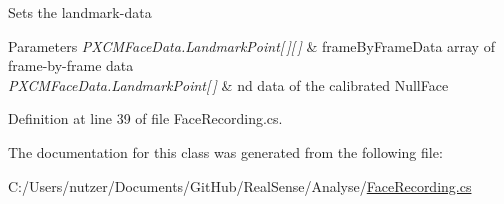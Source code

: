 Sets the landmark-\/data 
\begin{DoxyParams}{Parameters}
{\em P\+X\+C\+M\+Face\+Data.\+Landmark\+Point\mbox{[}$\,$\mbox{]}\mbox{[}$\,$\mbox{]}} & frame\+By\+Frame\+Data array of frame-\/by-\/frame data \\
\hline
{\em P\+X\+C\+M\+Face\+Data.\+Landmark\+Point\mbox{[}$\,$\mbox{]}} & nd data of the calibrated Null\+Face \\
\hline
\end{DoxyParams}


Definition at line 39 of file Face\+Recording.\+cs.



The documentation for this class was generated from the following file\+:\begin{DoxyCompactItemize}
\item 
C\+:/\+Users/nutzer/\+Documents/\+Git\+Hub/\+Real\+Sense/\+Analyse/\hyperlink{_face_recording_8cs}{Face\+Recording.\+cs}\end{DoxyCompactItemize}
